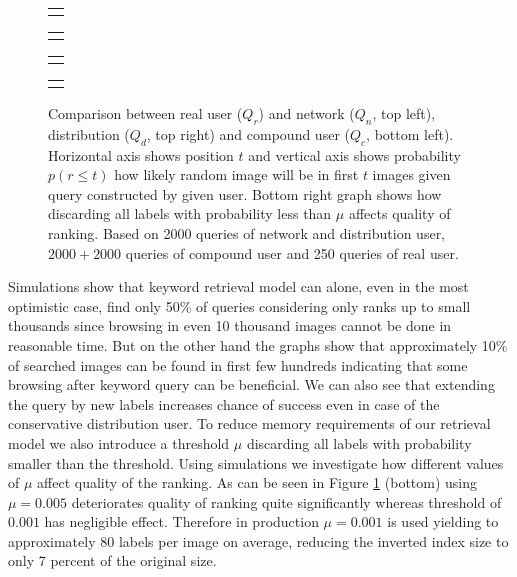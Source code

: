 \begin{figure}[h]
	\centering
	
	\begin{tabular}{@{}c@{}}
		\subfloat{
			
		}
	\end{tabular}
	\begin{tabular}{@{}c@{}}
		\subfloat{
			
		}
	\end{tabular}
	\begin{tabular}{@{}c@{}}
	\subfloat{
		
	}
	\end{tabular}
	\begin{tabular}{@{}c@{}}
		\subfloat{
			
		}
	\end{tabular}

	
	\caption[Comparison between simulated and real user]{Comparison between real user ($Q_r$) and network ($Q_n$, top left), distribution ($Q_d$, top right) and compound user ($Q_c$, bottom left). Horizontal axis shows position $t$ and vertical axis shows probability $p(r\leq t)$ how likely random image will be in first $t$ images given query constructed by given user. Bottom right graph shows how discarding all labels with probability less than $\mu$ affects quality of ranking. Based on 2000 queries of network and distribution user, $2000+2000$ queries of compound user and 250 queries of real user.}
	\label{fig:simulation_keyword}
\end{figure}
Simulations show that keyword retrieval model can alone, even in the most optimistic case, find only 50\% of queries considering only ranks up to small thousands since browsing in even 10 thousand images cannot be done in reasonable time. But on the other hand the graphs show that approximately 10\% of searched images can be found in first few hundreds indicating that some browsing after keyword query can be beneficial. We can also see that extending the query by new labels increases chance of success even in case of the conservative distribution user.
To reduce memory requirements of our retrieval model we also introduce a threshold $\mu$ discarding all labels with probability smaller than the threshold. Using simulations we investigate how different values of $\mu$ affect quality of the ranking. As can be seen in Figure \ref{fig:simulation_keyword} (bottom) using $\mu=0.005$ deteriorates quality of ranking quite significantly whereas threshold of $0.001$ has negligible effect. Therefore in production $\mu = 0.001$ is used yielding to approximately 80 labels per image on average, reducing the inverted index size to only 7 percent of the original size.

